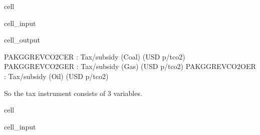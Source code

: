 \documentclass[letterpaper,10pt,english]{jupyterBook}
\begin{document}
\begin{sphinxuseclass}{cell}\begin{sphinxVerbatimInput}

\begin{sphinxuseclass}{cell_input}
\begin{sphinxVerbatim}[commandchars=\\\{\}]
   \PYG{p}{[}   \PYG{p}{]}
    \PYG{p}{[}\PYG{p}{]}
    
\end{sphinxVerbatim}

\end{sphinxuseclass}\end{sphinxVerbatimInput}
\begin{sphinxVerbatimOutput}

\begin{sphinxuseclass}{cell_output}
\begin{sphinxVerbatim}[commandchars=\\\{\}]
PAKGGREVCO2CER : Tax/subsidy (Coal) (USD p/tco2)
PAKGGREVCO2GER : Tax/subsidy (Gas) (USD p/tco2)
PAKGGREVCO2OER : Tax/subsidy (Oil) (USD p/tco2)
\end{sphinxVerbatim}

\end{sphinxuseclass}\end{sphinxVerbatimOutput}

\end{sphinxuseclass}
\sphinxAtStartPar
So the tax instrument consists of 3 variables.

\begin{sphinxuseclass}{cell}\begin{sphinxVerbatimInput}

\begin{sphinxuseclass}{cell_input}
\begin{sphinxVerbatim}[commandchars=\\\{\}]
  \PYG{p}{[}\PYG{p}{]}
  \PYG{p}{[}\PYG{p}{[} \PYG{p}{]}\PYG{p}{]}
\end{sphinxVerbatim}

\end{sphinxuseclass}\end{sphinxVerbatimInput}

\end{sphinxuseclass}
\end{document}

